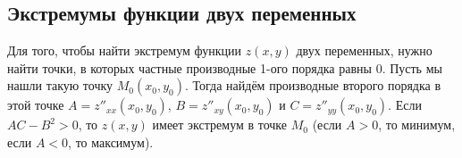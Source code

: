 \subsection{Экстремумы функции двух переменных}
Для того, чтобы найти экстремум функции $z(x,y)$ двух переменных, нужно найти точки, в которых частные производные 1-ого порядка равны $0$. Пусть мы нашли такую точку $M_0(x_0,y_0)$. Тогда найдём производные второго порядка в этой точке $A = z''_{xx}(x_0,y_0)$, $B = z''_{xy}(x_0,y_0)$ и $C = z''_{yy}(x_0,y_0)$. Если $AC - B^2 > 0$, то $z(x,y)$ имеет экстремум в точке $M_0$ (если $A > 0$, то минимум, если $A < 0$, то максимум).